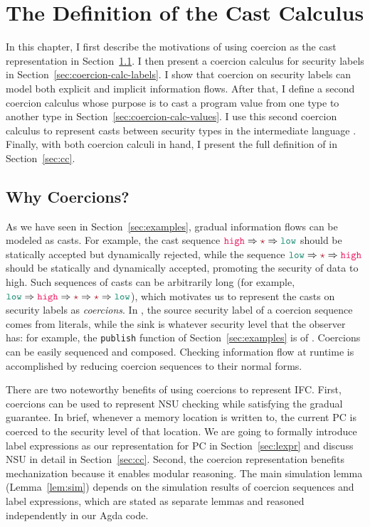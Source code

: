 \chapter{The Definition of the Cast Calculus \CC}
\label{ch:sem}


In this chapter, I first describe the motivations of using coercion as the cast
representation in Section~\ref{sec:why-coercions}. I then present a coercion
calculus for security labels in Section~\ref{sec:coercion-calc-labels}. I show
that coercion on security labels can model both explicit and implicit
information flows. After that, I define a second coercion calculus whose purpose
is to cast a program value from one type to another type in
Section~\ref{sec:coercion-calc-values}. I use this second coercion calculus to
represent casts between security types in the intermediate language \CC.
Finally, with both coercion calculi in hand, I present the full definition of
\CC in Section~\ref{sec:cc}.

\section{Why Coercions?}
\label{sec:why-coercions}

As we have seen in Section~\ref{sec:examples}, gradual information flows can be
modeled as casts. For example, the cast sequence $\high \Rightarrow \unk
\Rightarrow \low$ should be statically accepted but dynamically rejected, while
the sequence $\low \Rightarrow \unk \Rightarrow \high$ should be statically and
dynamically accepted, promoting the security of data to high. Such sequences of
casts can be arbitrarily long (for example, $\low \Rightarrow \high \Rightarrow
\unk \Rightarrow \unk \Rightarrow \low$), which motivates us to represent the
casts on security labels as \textit{coercions}. In \Surface, the source security
label of a coercion sequence comes from literals, while the sink is whatever
security level that the observer has: for example, the \texttt{publish} function
of Section~\ref{sec:examples} is of \low. Coercions can be easily sequenced and
composed. Checking information flow at runtime is accomplished by reducing
coercion sequences to their normal forms.

There are two noteworthy benefits of using coercions to represent IFC. First,
coercions can be used to represent NSU checking while satisfying the gradual
guarantee. In brief, whenever a memory location is written to, the current PC is
coerced to the security level of that location. We are going to formally
introduce label expressions as our representation for PC in
Section~\ref{sec:lexpr} and discuss NSU in detail in Section~\ref{sec:cc}.
Second, the coercion representation benefits mechanization because it enables
modular reasoning. The main simulation lemma (Lemma~\ref{lem:sim}) depends on
the simulation results of coercion sequences and label expressions, which are
stated as separate lemmas and reasoned independently in our Agda code.

